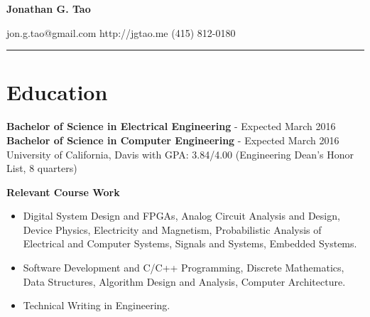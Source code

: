 \documentclass[10pt]{article}
\begin{document}
\noindent\begin{minipage}[t]{0.5\textwidth}
\huge \textbf{Jonathan G. Tao}
\end{minipage}
\begin{minipage}[b]{0.5\textwidth}
\small
\flushright
jon.g.tao@gmail.com\hspace{16pt}
http://jgtao.me\hspace{16pt}
(415) 812-0180
\end{minipage}
\noindent\rule{\linewidth}{0.05mm}

\section{Education}
\begin{adjustwidth}{16pt}{0pt}
\noindent\textbf{Bachelor of Science in Electrical Engineering}
 - Expected March 2016\\
\noindent\textbf{Bachelor of Science in Computer Engineering}
 - Expected March 2016\\
University of California, Davis \hspace{4pt} with \hspace{4pt}  GPA: 3.84/4.00
(Engineering Dean's Honor List, 8 quarters)

\vspace{8pt}
\noindent\textbf{Relevant Course Work}
\begin{itemize}
	\setlength\itemsep{0pt}
	\item Digital System Design and FPGAs, Analog Circuit Analysis and
	Design, Device Physics, Electricity and Magnetism, Probabilistic Analysis of
	Electrical and Computer Systems, Signals and Systems, Embedded Systems.
	\item Software Development and C/C++ Programming, Discrete Mathematics, Data
	Structures, Algorithm Design and Analysis, Computer Architecture.
	\item Technical Writing in Engineering.
\end{itemize}
\end{adjustwidth}
\end{document}
